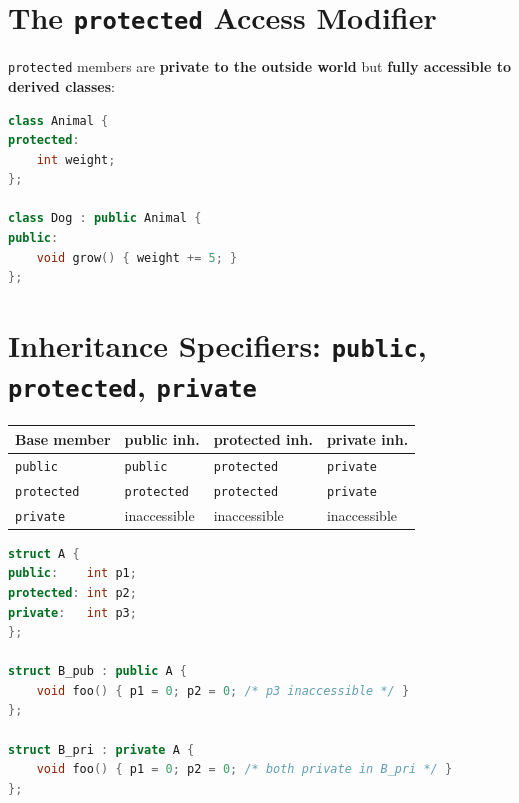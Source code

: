\section{The \texttt{protected} Access Modifier}
\label{sec:protected}

\texttt{protected} members are \textbf{private to the outside world} but \textbf{fully accessible to derived classes}:

\begin{lstlisting}[language=C++, caption={protected member shared with derived classes}]
class Animal {
protected:
    int weight;
};

class Dog : public Animal {
public:
    void grow() { weight += 5; }
};
\end{lstlisting}

\section{Inheritance Specifiers: \texttt{public}, \texttt{protected}, \texttt{private}}
\label{sec:inheritance-specifiers}

\begin{center}
\begin{tabular}{|l|l|l|l|}
\hline
\textbf{Base member} & \textbf{public inh.} & \textbf{protected inh.} & \textbf{private inh.} \\
\hline
\texttt{public}    & \texttt{public}    & \texttt{protected} & \texttt{private} \\
\texttt{protected} & \texttt{protected} & \texttt{protected} & \texttt{private} \\
\texttt{private}   & inaccessible       & inaccessible       & inaccessible     \\
\hline
\end{tabular}
\end{center}

\begin{lstlisting}[language=C++, caption={Access under three inheritance modes}]
struct A {
public:    int p1;
protected: int p2;
private:   int p3;
};

struct B_pub : public A {
    void foo() { p1 = 0; p2 = 0; /* p3 inaccessible */ }
};

struct B_pri : private A {
    void foo() { p1 = 0; p2 = 0; /* both private in B_pri */ }
};
\end{lstlisting}


